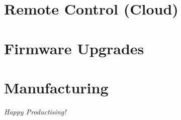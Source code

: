 \documentclass[11pt,fleqn]{book} %
\begin{document}

\chapter{Remote Control (Cloud)}



\chapter{Firmware Upgrades}



\chapter{Manufacturing}

\clearpage
\vspace*{\fill} 
\centering \Huge {\textit{Happy Productising!}}
\vspace*{\fill} 
\end{document}
